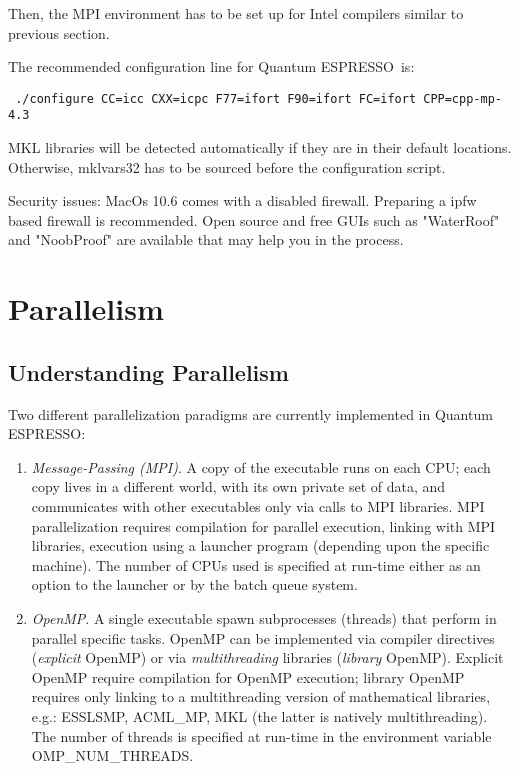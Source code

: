 \documentclass[12pt,a4paper]{article}
\def\qe{{\sc Quantum ESPRESSO}}
\begin{document}
Then, the MPI environment has to be set up for Intel compilers similar to previous
section.

The recommended configuration line for \qe\ is:
\begin{verbatim}
 ./configure CC=icc CXX=icpc F77=ifort F90=ifort FC=ifort CPP=cpp-mp-4.3
\end{verbatim}
MKL libraries will be detected automatically if they are in their default locations.
Otherwise, mklvars32 has to be sourced before the configuration script.

Security issues:
MacOs 10.6 comes with a disabled firewall. Preparing a ipfw based firewall is recommended.
Open source and free GUIs such as "WaterRoof" and "NoobProof" are available that may help
you in the process.

\newpage

\section{Parallelism}
\label{Sec:para}

\subsection{Understanding Parallelism}

Two different parallelization paradigms are currently implemented
in \qe:
\begin{enumerate}
\item {\em Message-Passing (MPI)}. A copy of the executable runs
on each CPU; each copy lives in a different world, with its own
private set of data, and communicates with other executables only
via calls to MPI libraries. MPI parallelization requires compilation
for parallel execution, linking with MPI libraries, execution using
a launcher program (depending upon the specific machine). The number of CPUs used
is specified at run-time either as an option to the launcher or
by the batch queue system.
\item {\em OpenMP}.  A single executable spawn subprocesses
(threads) that perform in parallel specific tasks.
OpenMP can be implemented via compiler directives ({\em explicit}
OpenMP) or via {\em multithreading} libraries  ({\em library} OpenMP).
Explicit OpenMP require compilation for OpenMP execution;
library OpenMP requires only linking to a multithreading
version of mathematical libraries, e.g.:
ESSLSMP, ACML\_MP, MKL (the latter is natively multithreading).
The number of threads is specified at run-time in the environment
variable OMP\_NUM\_THREADS.
\end{enumerate}
\end{document}
